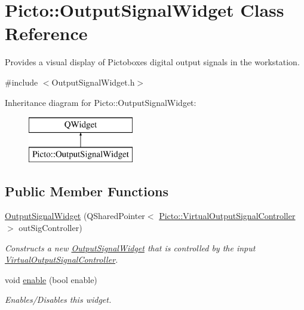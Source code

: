 \hypertarget{class_picto_1_1_output_signal_widget}{\section{Picto\-:\-:Output\-Signal\-Widget Class Reference}
\label{class_picto_1_1_output_signal_widget}
}


Provides a visual display of Pictoboxes digital output signals in the workstation.  




{\ttfamily \#include $<$Output\-Signal\-Widget.\-h$>$}

Inheritance diagram for Picto\-:\-:Output\-Signal\-Widget\-:\begin{figure}[H]
\begin{center}
\leavevmode
\includegraphics[height=2.000000cm]{class_picto_1_1_output_signal_widget}
\end{center}
\end{figure}
\subsection*{Public Member Functions}
\begin{DoxyCompactItemize}
\item 
\hypertarget{class_picto_1_1_output_signal_widget_ad5e9b95dd7d0e066980d72b106d016e6}{\hyperlink{class_picto_1_1_output_signal_widget_ad5e9b95dd7d0e066980d72b106d016e6}{Output\-Signal\-Widget} (Q\-Shared\-Pointer$<$ \hyperlink{class_picto_1_1_virtual_output_signal_controller}{Picto\-::\-Virtual\-Output\-Signal\-Controller} $>$ out\-Sig\-Controller)}\label{class_picto_1_1_output_signal_widget_ad5e9b95dd7d0e066980d72b106d016e6}

\begin{DoxyCompactList}\small\item\em Constructs a new \hyperlink{class_picto_1_1_output_signal_widget}{Output\-Signal\-Widget} that is controlled by the input \hyperlink{class_picto_1_1_virtual_output_signal_controller}{Virtual\-Output\-Signal\-Controller}. \end{DoxyCompactList}\item 
void \hyperlink{class_picto_1_1_output_signal_widget_a0c51033620dc219a6d8c81e9e7d68897}{enable} (bool enable)
\begin{DoxyCompactList}\small\item\em Enables/\-Disables this widget. \end{DoxyCompactList}\end{DoxyCompactItemize}


